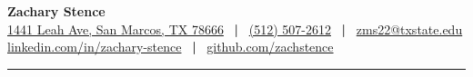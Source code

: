 \documentclass[letterpaper, 10pt]{article}
\makeatletter
\newcommand{\ressubheading}[4]{
\begin{tabular*}{6.609in}{l@{\cftdotfill{\cftsecdotsep}\extracolsep{\fill}}r}
        \textbf{#1} & #2 \\
        \textit{#3} & #4 \\
\end{tabular*}\vspace{-6pt}}
\newcommand{\sep}{\ \textbf{|} \ }
\makeatother
\begin{document}


%
%


\textbf{\huge Zachary Stence} \\[2pt]
 \href{https://goo.gl/maps/5kUt8MF8fhMqY8UM9}{1441 Leah Ave, San Marcos, TX 78666} \sep \href{tel:15125072612}{(512) 507-2612} \sep \href{mailto:zms22@txstate.edu}{zms22@txstate.edu} \\
 \href{https://www.linkedin.com/in/zachary-stence}{linkedin.com/in/zachary-stence} \sep  \href{https://www.github.com/zachstence}{github.com/zachstence} \\[6pt]

\hrule

\vspace{2pt}

%
%



\end{document}
